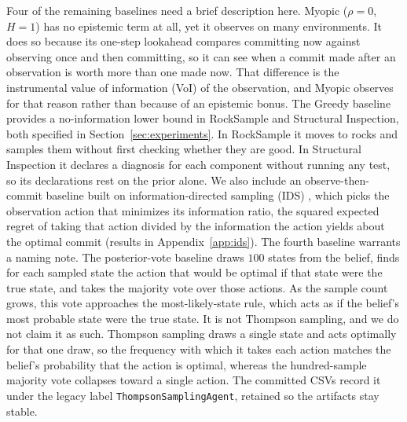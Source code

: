 Four of the remaining baselines need a brief description here. Myopic ($\rho{=}0$, $H{=}1$) has no epistemic term at all, yet it observes on many environments. It does so because its one-step lookahead compares committing now against observing once and then committing, so it can see when a commit made after an observation is worth more than one made now. That difference is the instrumental value of information (VoI) of the observation, and Myopic observes for that reason rather than because of an epistemic bonus. The Greedy baseline provides a no-information lower bound in RockSample and Structural Inspection, both specified in Section~\ref{sec:experiments}. In RockSample it moves to rocks and samples them without first checking whether they are good. In Structural Inspection it declares a diagnosis for each component without running any test, so its declarations rest on the prior alone. We also include an observe-then-commit baseline built on information-directed sampling (IDS) \citep{russo2014}, which picks the observation action that minimizes its information ratio, the squared expected regret of taking that action divided by the information the action yields about the optimal commit (results in Appendix~\ref{app:ids}). The fourth baseline warrants a naming note. The posterior-vote baseline draws $100$ states from the belief, finds for each sampled state the action that would be optimal if that state were the true state, and takes the majority vote over those actions. As the sample count grows, this vote approaches the most-likely-state rule, which acts as if the belief's most probable state were the true state. It is not Thompson sampling, and we do not claim it as such. Thompson sampling draws a single state and acts optimally for that one draw, so the frequency with which it takes each action matches the belief's probability that the action is optimal, whereas the hundred-sample majority vote collapses toward a single action. The committed CSVs record it under the legacy label \texttt{ThompsonSamplingAgent}, retained so the artifacts stay stable.

